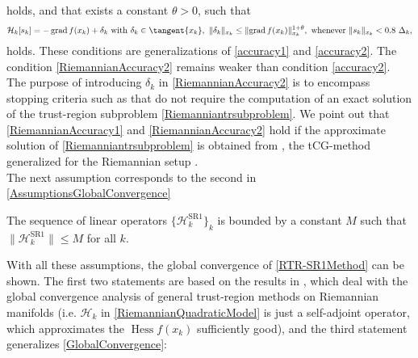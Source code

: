 holds, and that exists a constant $\theta > 0$, such that 
\begin{equation}\label{RiemannianAccuracy2}
    \mathcal{H}_k [s_k] = - \operatorname{grad} f(x_k) + \delta_k \text{ with } \delta_k \in \tangent{x_k}, \ \lVert \delta_k \rVert_{x_k} \leq \lVert \operatorname{grad} f(x_k) \rVert^{1 + \theta}_{x_k}, \text{ whenever } \lVert s_k \rVert_{x_k} < 0.8 \ \Delta_k,
\end{equation}
holds. These conditions are generalizations of \cref{accuracy1} and \cref{accuracy2}. The condition \cref{RiemannianAccuracy2} remains weaker than condition \cref{accuracy2}. The purpose of introducing $\delta_k$ in \cref{RiemannianAccuracy2} is to encompass stopping criteria such as \cite[(7.10)]{AbsilMahonySepulchre:2008} that do not require the computation of an exact solution of the trust-region subproblem \cref{Riemanniantrsubproblem}. We point out that \cref{RiemannianAccuracy1} and \cref{RiemannianAccuracy2} hold if the approximate solution of \cref{Riemanniantrsubproblem} is obtained from \cite[Algorithm~11]{AbsilMahonySepulchre:2008}, the tCG-method generalized for the Riemannian setup \cite[p.~7]{HuangAbsilGallivan:2014}. \\
The next assumption corresponds to the second in \cref{AssumptionsGlobalConvergence}
\begin{assumption}\label{RiemannianAssumptionsGlobalConvergence} 
    The sequence of linear operators $\{ \mathcal{H}^{\mathrm{SR1}}_k \}_k$ is bounded by a constant $M$ such that $\lVert \mathcal{H}^{\mathrm{SR1}}_k \rVert \leq M$ for all $k$.
\end{assumption}
With all these assumptions, the global convergence of \cref{RTR-SR1Method} can be shown. The first two statements are based on the results in \cite[7.4.1~Global~convergence]{AbsilMahonySepulchre:2008}, which deal with the global convergence analysis of general trust-region methods on Riemannian manifolds (i.e. $\mathcal{H}_k$ in \cref{RiemannianQuadraticModel} is just a self-adjoint operator, which approximates the $\operatorname{Hess} f(x_k)$ sufficiently good), and the third statement generalizes \cref{GlobalConvergence}:
